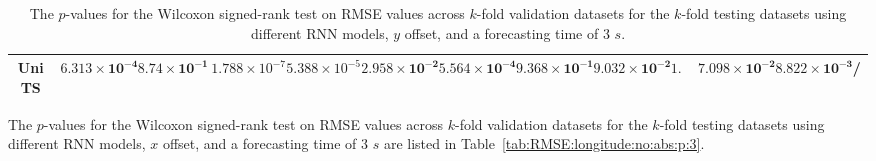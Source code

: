 \begin{table}[!ht]
{\begin{tabular}{|c|c|c|c|c|c|c|c|c|c|c|c|c|}
			UniTS & $\mathbf{6.313 \times 10^{-4}}$ & $\mathbf{8.74 \times 10^{-1}}$ & $1.788 \times 10^{-7}$ & $5.388 \times 10^{-5}$ & $\mathbf{2.958 \times 10^{-2}}$ & $\mathbf{5.564 \times 10^{-4}}$ & $\mathbf{9.368 \times 10^{-1}}$ & $\mathbf{9.032 \times 10^{-2}}$ & $\mathbf{1.0}$ & $\mathbf{7.098 \times 10^{-2}}$ & $\mathbf{8.822 \times 10^{-3}}$ & / \\ \hline
		\end{tabular}
	}
	\caption{The $p$-values for the Wilcoxon signed-rank test on RMSE values across $k$-fold validation datasets for the $k$-fold testing datasets using different RNN models, $y$ offset, and a forecasting time of $3$ $s$.}
	\label{tab:RMSE:latitude:no:abs:p:3}
\end{table}

The $p$-values for the Wilcoxon signed-rank test on RMSE values across $k$-fold validation datasets for the $k$-fold testing datasets using different RNN models, $x$ offset, and a forecasting time of $3$ $s$ are listed in Table~\ref{tab:RMSE:longitude:no:abs:p:3}.

